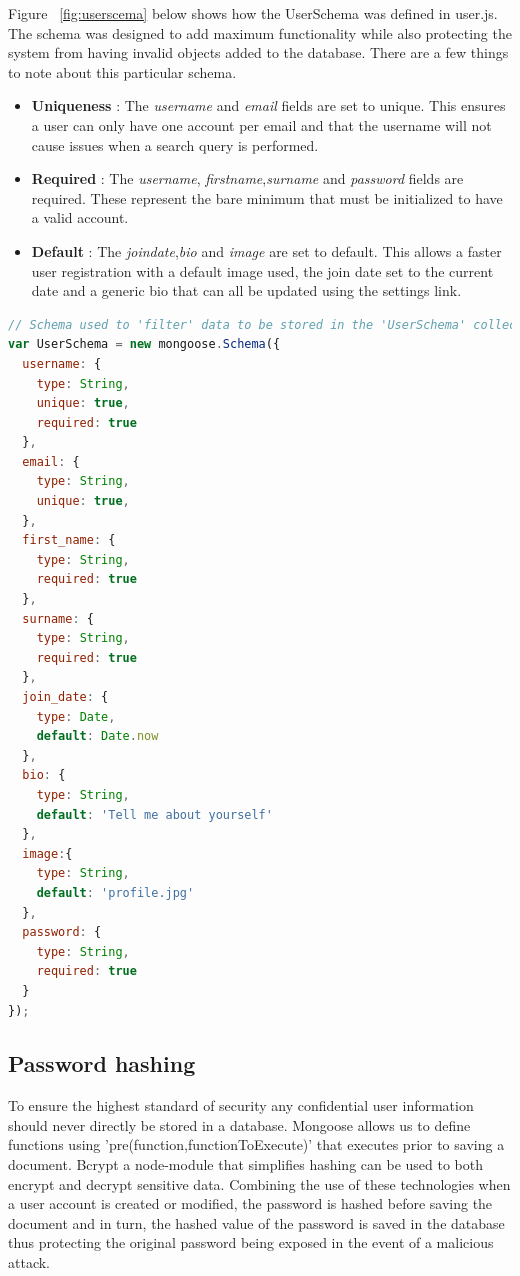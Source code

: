 Figure ~\ref{fig:userscema} below shows how the UserSchema was defined in user.js. The schema was designed to add maximum functionality while also protecting the system from having invalid objects added to the database. There are a few things to note about this particular schema.
\begin{itemize}
\item \textbf{Uniqueness} : The \textit{username} and \textit{email} fields are set to unique. This ensures a user can only have one account per email and that the username will not cause issues when a search query is performed.
\item \textbf{Required} : The \textit{username}, \textit{firstname},\textit{surname} and \textit{password} fields are required. These represent the bare minimum that must be initialized to have a valid account.
\item \textbf{Default} : The \textit{joindate},\textit{bio} and \textit{image} are set to default. This allows a faster user registration with a default image used, the join date set to the current date and a generic bio that can all be updated using the settings link.
\end{itemize}

\begin{lstlisting}[language=JavaScript,caption={Defining User Schema},captionpos=b,label={fig:userscema}]
// Schema used to 'filter' data to be stored in the 'UserSchema' collection in mongo
var UserSchema = new mongoose.Schema({
  username: {
    type: String,
    unique: true,
    required: true
  },
  email: {
    type: String,
    unique: true,
  },
  first_name: {
    type: String,
    required: true
  },
  surname: {
    type: String,
    required: true
  },
  join_date: {
    type: Date,
    default: Date.now
  },
  bio: {
    type: String,
    default: 'Tell me about yourself'
  },
  image:{
    type: String,
    default: 'profile.jpg'
  },
  password: {
    type: String,
    required: true
  }
});

\end{lstlisting}

\subsection{Password hashing}
To ensure the highest standard of security any confidential user information should never directly be stored in a database. Mongoose allows us to define functions using 'pre(function,functionToExecute)' that executes prior to saving a document. Bcrypt a node-module that simplifies hashing can be used to both encrypt and decrypt sensitive data. Combining the use of these technologies when a user account is created or modified, the password is hashed before saving the document and in turn, the hashed value of the password is saved in the database thus protecting the original password being exposed in the event of a malicious attack.

